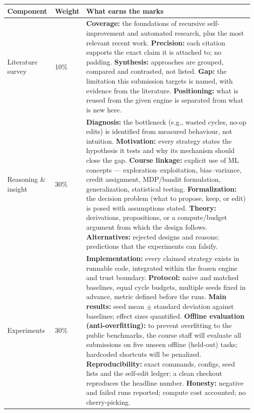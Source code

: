 \documentclass{article}
\begin{document}
\vspace{10pt}
\begin{center}
\small
\begin{tabular}{@{}p{3.1cm}p{1.4cm}p{14.1cm}@{}}
\toprule
\textbf{Component} & \textbf{Weight} & \textbf{What earns the marks} \\
\midrule
Literature survey & 10\% & \textbf{Coverage:} the foundations of recursive self-improvement and automated research, plus the most relevant recent work. \newline \textbf{Precision:} each citation supports the exact claim it is attached to; no padding. \newline \textbf{Synthesis:} approaches are grouped, compared and contrasted, not listed. \newline \textbf{Gap:} the limitation this submission targets is named, with evidence from the literature. \newline \textbf{Positioning:} what is reused from the given engine is separated from what is new here. \\
\addlinespace[5pt]
\midrule
Reasoning \& insight & 30\% & \textbf{Diagnosis:} the bottleneck (e.g., wasted cycles, no-op edits) is identified from measured behaviour, not intuition. \newline \textbf{Motivation:} every strategy states the hypothesis it tests and why its mechanism should close the gap. \newline \textbf{Course linkage:} explicit use of ML concepts --- exploration--exploitation, bias--variance, credit assignment, MDP/bandit formulation, generalization, statistical testing. \newline \textbf{Formalization:} the decision problem (what to propose, keep, or edit) is posed with assumptions stated. \newline \textbf{Theory:} derivations, propositions, or a compute/budget argument from which the design follows. \newline \textbf{Alternatives:} rejected designs and reasons; predictions that the experiments can falsify. \\
\addlinespace[5pt]
\midrule
Experiments & 30\% & \textbf{Implementation:} every claimed strategy exists in runnable code, integrated within the frozen engine and trust boundary. \newline \textbf{Protocol:} naive and matched baselines, equal cycle budgets, multiple seeds fixed in advance, metric defined before the runs. \newline \textbf{Main results:} seed mean $\pm$ standard deviation against baselines; effect sizes quantified. \newline \textbf{Offline evaluation (anti-overfitting):} to prevent overfitting to the public benchmarks, the course staff will evaluate all submissions on five unseen offline (held-out) tasks; hardcoded shortcuts will be penalized. \newline \textbf{Reproducibility:} exact commands, configs, seed lists and the self-edit ledger; a clean checkout reproduces the headline number. \newline \textbf{Honesty:} negative and failed runs reported; compute cost accounted; no cherry-picking. \\

\end{tabular}
\end{center}
\end{document}
